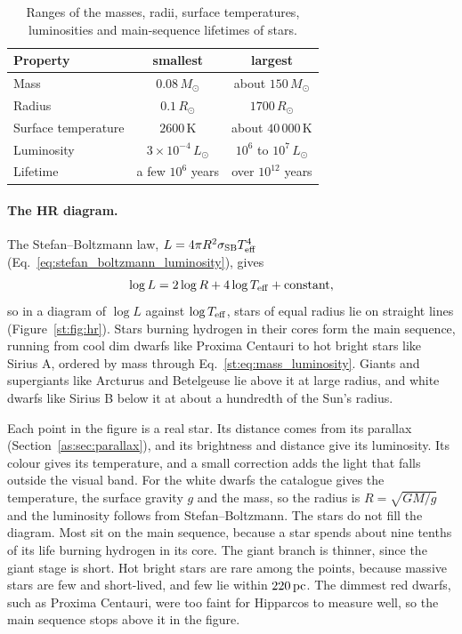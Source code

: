 \begin{table}[htbp]
	\centering
	\begin{tabular}{@{}l c c@{}}
		\toprule
		\textbf{Property} & \textbf{smallest} & \textbf{largest} \\
		\midrule
		Mass & $0.08\,M_\odot$ & about $150\,M_\odot$ \\
		Radius & $0.1\,R_\odot$ & $1700\,R_\odot$ \\
		Surface temperature & $2600\,\mathrm K$ & about $40\,000\,\mathrm K$ \\
		Luminosity & $3\times10^{-4}\,L_\odot$ & $10^6$ to $10^7\,L_\odot$ \\
		Lifetime & a few $10^6$ years & over $10^{12}$ years \\
		\bottomrule
	\end{tabular}
	\caption{Ranges of the masses, radii, surface temperatures, luminosities and main-sequence lifetimes of stars.}
	\label{st:tab:ranges}
\end{table}

\paragraph{The HR diagram.} The Stefan–Boltzmann law, $L=4\pi R^2\sigma_{\rm SB}T_{\rm eff}^4$ (Eq.~\eqref{eq:stefan_boltzmann_luminosity}), gives
\[
\log L=2\log R+4\log T_{\rm eff}+\text{constant},
\]
so in a diagram of $\log L$ against $\log T_{\rm eff}$, stars of equal radius lie on straight lines (Figure~\ref{st:fig:hr}). Stars burning hydrogen in their cores form the main sequence, running from cool dim dwarfs like Proxima Centauri to hot bright stars like Sirius A, ordered by mass through Eq.~\eqref{st:eq:mass_luminosity}. Giants and supergiants like Arcturus and Betelgeuse lie above it at large radius, and white dwarfs like Sirius B below it at about a hundredth of the Sun's radius.

Each point in the figure is a real star. Its distance comes from its parallax (Section~\ref{as:sec:parallax}), and its brightness and distance give its luminosity. Its colour gives its temperature, and a small correction adds the light that falls outside the visual band. For the white dwarfs the catalogue gives the temperature, the surface gravity $g$ and the mass, so the radius is $R=\sqrt{GM/g}$ and the luminosity follows from Stefan–Boltzmann. The stars do not fill the diagram. Most sit on the main sequence, because a star spends about nine tenths of its life burning hydrogen in its core. The giant branch is thinner, since the giant stage is short. Hot bright stars are rare among the points, because massive stars are few and short-lived, and few lie within $220\,\mathrm{pc}$. The dimmest red dwarfs, such as Proxima Centauri, were too faint for Hipparcos to measure well, so the main sequence stops above it in the figure.

